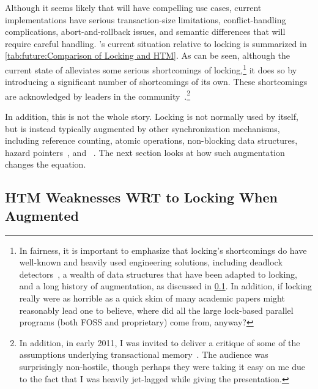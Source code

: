 Although it seems likely that  will have compelling use cases,
current implementations have serious transaction-size limitations,
conflict-handling complications, abort-and-rollback issues, and
semantic differences that will require careful handling.
's current situation relative to locking is summarized in
\cref{tab:future:Comparison of Locking and HTM}.
As can be seen, although the current state of  alleviates some
serious shortcomings of locking,\footnote{
	In fairness, it is important to emphasize that locking's shortcomings
	do have well-known and heavily used engineering solutions, including
	deadlock detectors~\cite{JonathanCorbet2006lockdep}, a wealth
	of data structures that have been adapted to locking, and
	a long history of augmentation, as discussed in
	\cref{sec:future:HTM Weaknesses WRT to Locking When Augmented}.
	In addition, if locking really were as horrible as a quick skim
	of many academic papers might reasonably lead one to believe,
	where did all the large lock-based parallel programs (both
	FOSS and proprietary) come from, anyway?}
it does so by introducing a significant
number of shortcomings of its own.
These shortcomings are acknowledged by leaders in the 
community~\cite{AlexanderMatveev2012PessimisticTM}.\footnote{
	In addition, in early 2011, I was invited to deliver a critique of
	some of the assumptions underlying transactional
	memory~\cite{PaulEMcKenney2011Verico}.
	The audience was surprisingly non-hostile, though perhaps they
	were taking it easy on me due to the fact that I was heavily
	jet-lagged while giving the presentation.}

In addition, this is not the whole story.
Locking is not normally used by itself, but is instead typically
augmented by other synchronization mechanisms,
including reference counting, atomic operations, non-blocking data structures,
hazard pointers~\cite{MagedMichael04a,HerlihyLM02},
and ~\cite{McKenney98,McKenney01a,ThomasEHart2007a,PaulEMcKenney2012ELCbattery}.
The next section looks at how such augmentation changes the equation.

\subsection{HTM Weaknesses WRT to Locking When Augmented}
\label{sec:future:HTM Weaknesses WRT to Locking When Augmented}



